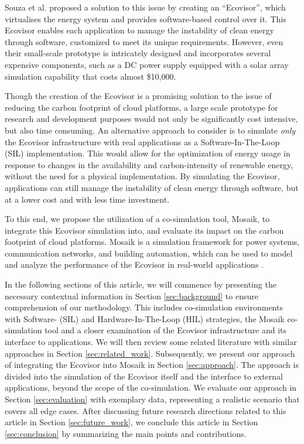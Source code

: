 Souza et al. \cite{souza2023} proposed a solution to this issue by creating an
\enquote{Ecovisor}, which virtualises the energy system and provides
software-based control over it. This Ecovisor enables each application to manage
the instability of clean energy through software, customized to meet its unique
requirements. However, even their small-scale prototype is intricately designed
and incorporates several expensive components, such as a DC power supply
equipped with a solar array simulation capability that costs almost \$10,000.

Though the creation of the Ecovisor is a promising solution to the issue of
reducing the carbon footprint of cloud platforms, a large scale prototype for
research and development purposes would not only be significantly cost
intensive, but also time consuming. An alternative approach to consider is to
simulate \emph{only} the Ecovisor infrastructure with real applications as a
Software-In-The-Loop (SIL) implementation. This would allow for the optimization
of energy usage in response to changes in the availability and carbon-intensity
of renewable energy, without the need for a physical implementation. By
simulating the Ecovisor, applications can still manage the instability of clean
energy through software, but at a lower cost and with less time investment.

To this end, we propose the utilization of a co-simulation tool, Mosaik, to
integrate this Ecovisor simulation into, and evaluate its impact on the carbon
footprint of cloud platforms. Mosaik is a simulation framework for power
systems, communication networks, and building automation, which can be used to
model and analyze the performance of the Ecovisor in real-world applications
\cite{steinbrink2019}. \medskip

In the following sections of this article, we will commence by presenting the
necessary contextual information in Section \ref{sec:background} to ensure
comprehension of our methodology. This includes co-simulation environments with
Software- (SIL) and Hardware-In-The-Loop (HIL) strategies, the Mosaik
co-simulation tool and a closer examination of the Ecovisor infrastructure and
its interface to applications. We will then review some related literature with
similar approaches in Section \ref{sec:related_work}. Subsequently, we present
our approach of integrating the Ecovisor into Mosaik in Section
\ref{sec:approach}. The approach is divided into the simulation of the Ecovisor
itself and the interface to external applications, beyond the scope of the
co-simulation. We evaluate our approach in Section \ref{sec:evaluation} with
exemplary data, representing a realistic scenario that covers all edge cases.
After discussing future research directions related to this article in Section
\ref{sec:future_work}, we conclude this article in Section \ref{sec:conclusion}
by summarizing the main points and contributions.
